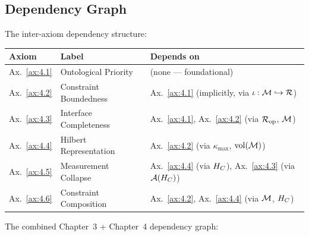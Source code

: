 \subsection{Dependency Graph}
\label{sec:ch4:depgraph}

The inter-axiom dependency structure:

\begin{center}
\begin{tabular}{lll}
\hline
\textbf{Axiom} & \textbf{Label} & \textbf{Depends on} \\
\hline
Ax.~\ref{ax:4.1} & Ontological Priority &
  (none — foundational) \\
Ax.~\ref{ax:4.2} & Constraint Boundedness &
  Ax.~\ref{ax:4.1} (implicitly, via $\iota : \mathcal{M} \hookrightarrow \mathcal{R}$) \\
Ax.~\ref{ax:4.3} & Interface Completeness &
  Ax.~\ref{ax:4.1}, Ax.~\ref{ax:4.2} (via $\mathcal{R}_{\mathrm{op}}$, $\mathcal{M}$) \\
Ax.~\ref{ax:4.4} & Hilbert Representation &
  Ax.~\ref{ax:4.2} (via $\kappa_{\max}$, $\mathrm{vol}(\mathcal{M})$) \\
Ax.~\ref{ax:4.5} & Measurement Collapse &
  Ax.~\ref{ax:4.4} (via $H_C$), Ax.~\ref{ax:4.3} (via $\mathcal{A}(H_C)$) \\
Ax.~\ref{ax:4.6} & Constraint Composition &
  Ax.~\ref{ax:4.2}, Ax.~\ref{ax:4.4} (via $\mathcal{M}$, $H_C$) \\
\hline
\end{tabular}
\end{center}

\medskip
\noindent
The combined Chapter~3 + Chapter~4 dependency graph:

